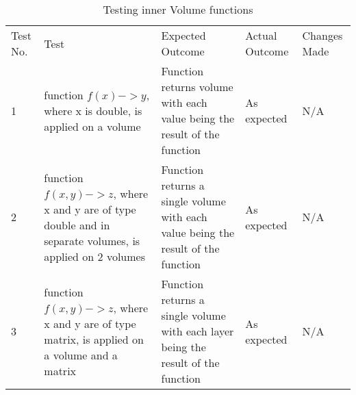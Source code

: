 \begin{table}[H]
\centering
    \begin{tabular}{|p{1cm}|p{4cm}|p{4cm}|p{3cm}|p{2cm}|}
        \hline
        Test No. & Test & Expected Outcome & Actual Outcome & Changes Made \\ \cline{1-5} 
        1 & function $f(x) -> y$, where x is double, is applied on a volume & Function returns volume with each value being the result of the function & As expected & N/A \\ \cline{1-5}
        2 & function $f(x, y) -> z$, where x and y are of type double and in separate volumes, is applied on 2 volumes & Function returns a single volume with each value being the result of the function & As expected & N/A \\ \cline{1-5}
        3 & function $f(x, y) -> z$, where x and y are of type matrix, is applied on a volume and a matrix & Function returns a single volume with each layer being the result of the function & As expected & N/A \\ \cline{1-5}
    \end{tabular}
    \caption{Testing inner Volume functions}
    \vspace{0.5cm}
\end{table}